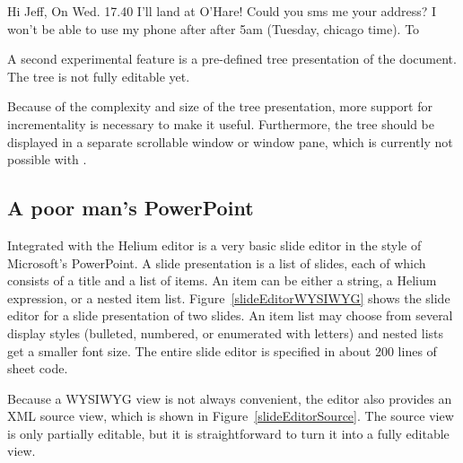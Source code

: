  \then



Hi Jeff, On Wed. 17.40 I'll land at O'Hare! Could you sms me your address? I won't be able to use my phone after after 5am (Tuesday, chicago time). To

A second experimental feature is a pre-defined tree presentation of the document. The tree is not fully editable yet.


Because of the complexity and size of the tree presentation, more support for incrementality is necessary to make it useful. Furthermore, the tree should be displayed in a separate scrollable window or window pane, which is currently not possible with {\Xprez}.



\subsection{A poor man's PowerPoint}

Integrated with the Helium editor is a very basic slide editor in the style of Microsoft's PowerPoint. A slide presentation is a list of slides, each of which consists of a title and a list of items. An item can be either a string, a Helium expression, or a nested item list. Figure~\ref{slideEditorWYSIWYG} shows the slide editor for a slide presentation of two slides. An item list may choose from several display styles (bulleted, numbered, or enumerated with letters) and nested lists get a smaller font size. The entire slide editor is specified in about 200 lines of sheet code.

Because a WYSIWYG view is not always convenient, the editor also provides an XML source view, which is shown in Figure~\ref{slideEditorSource}. The source view is only partially editable, but it is straightforward to turn it into a fully editable view. 

